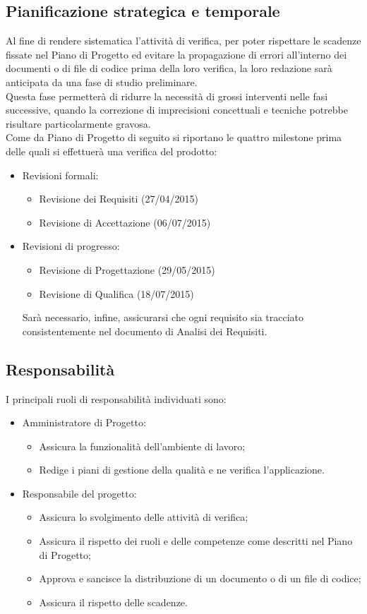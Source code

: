 {\subsection{Pianificazione strategica e temporale}{
	Al fine di rendere sistematica l'attività di verifica, per poter rispettare le scadenze fissate nel Piano di Progetto ed evitare la propagazione di errori all'interno dei documenti o di file di codice prima della loro verifica, la loro redazione sarà anticipata da una fase di studio preliminare. \\
	Questa fase permetterà di ridurre la necessità di grossi interventi nelle fasi successive, quando la correzione di imprecisioni concettuali e tecniche potrebbe risultare particolarmente gravosa. \\
	Come da Piano di Progetto di seguito si riportano le quattro milestone prima delle quali si effettuerà una verifica del prodotto:
	\begin{itemize}
		\item Revisioni formali:
		\begin{itemize}
			\item Revisione dei Requisiti (27/04/2015)
			\item Revisione di Accettazione (06/07/2015)
		\end{itemize}
		\item Revisioni di progresso:
		\begin{itemize}
			\item Revisione di Progettazione (29/05/2015)
			\item Revisione di Qualifica (18/07/2015)
		\end{itemize}
		Sarà necessario, infine, assicurarsi che ogni requisito sia tracciato consistentemente nel documento di Analisi dei Requisiti.
	\end{itemize}
	}
\subsection{Responsabilità}{
I principali ruoli di responsabilità individuati sono:
\begin{itemize}
	\item Amministratore di Progetto:
	\begin{itemize}
		\item Assicura la funzionalità dell'ambiente di lavoro;
		\item Redige i piani di gestione della qualità e ne verifica l'applicazione.
	\end{itemize}
	\item Responsabile del progetto:
	\begin{itemize}
		\item Assicura lo svolgimento delle attività di verifica;
		\item Assicura il rispetto dei ruoli e delle competenze come descritti nel Piano di Progetto;
		\item Approva e sancisce la distribuzione di un documento o di un file di codice;
		\item Assicura il rispetto delle scadenze.
	\end{itemize}
\end{itemize}
}
}
